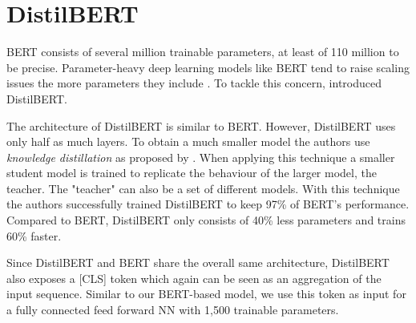 \section{DistilBERT}
\label{chp:approach:sec:distilbert}

\Ac{BERT} consists of several million trainable parameters, at least of 110 million to be precise.
Parameter-heavy deep learning models like \ac{BERT} tend to raise scaling issues the more parameters they include \parencite{Schwartz:2019}.
To tackle this concern, \textcite{Sanh:2019} introduced \acl{DistilBERT}.

The architecture of \ac{DistilBERT} is similar to \ac{BERT}.
However, \ac{DistilBERT} uses only half as much layers.
To obtain a much smaller model the authors use \textit{knowledge distillation} as proposed by \textcites{Bucilua:2006}{Hinton:2015}.
When applying this technique a smaller student model is trained to replicate the behaviour of the larger model, the teacher.
The "teacher" can also be a set of different models.
With this technique the authors successfully trained \ac{DistilBERT} to keep 97\% of \ac{BERT}'s performance.
Compared to \ac{BERT}, \ac{DistilBERT} only consists of 40\% less parameters and trains 60\% faster. \parencite{Sanh:2019}

Since \ac{DistilBERT} and \ac{BERT} share the overall same architecture, \ac{DistilBERT} also exposes a [CLS] token which again can be seen as an aggregation of the input sequence.
Similar to our \ac{BERT}-based model, we use this token as input for a fully connected feed forward \ac{NN} with 1,500 trainable parameters.
